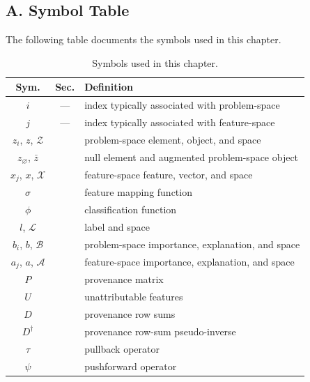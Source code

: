
\subsection*{A. Symbol Table}

The following table documents the symbols used in this chapter.

\begin{table}[H]
  \setlength{\tabcolsep}{4pt}
  \renewcommand{\arraystretch}{0.92}
  \footnotesize
    \centering
    \begin{tabular}{@{}c | c | l@{}}
      Sym. & Sec. & Definition \\
      \toprule
      $i$ & --- & index typically associated with problem-space \\
      $j$ & --- & index typically associated with feature-space \\
      \midrule
      $z_i$, $z$, $\mathcal{Z}$ &  & problem-space element, object, and space \\
      $z_\varnothing$, $\bar{z}$ &  & null element and augmented problem-space object \\
      $x_j$, $x$, $\mathcal{X}$ &  & feature-space feature, vector, and space \\
      $\sigma$ &  & feature mapping function \\
      $\phi$ &  & classification function \\
      $l$, $\mathcal{L}$ &  & label and space \\
      \midrule
      $b_i$, $b$, $\mathcal{B}$ &  & problem-space importance, explanation, and space \\
      $a_j$, $a$, $\mathcal{A}$ &  & feature-space importance, explanation, and space \\
      \midrule
      $P$ &  & provenance matrix \\
      $U$ &  & unattributable features \\
      $D$ &  & provenance row sums \\
      $D^\dagger$ &  & provenance row-sum pseudo-inverse \\
      $\tau$ &  & pullback operator \\
      $\psi$ &  & pushforward operator \\
      \bottomrule
    \end{tabular}
  \caption{Symbols used in this chapter.}
  \label{tab:XML:Symbol_Table}
\end{table}

